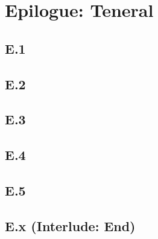 \part{Epilogue: Teneral}
 \chapter{E.1}
 \chapter{E.2}
 \chapter{E.3}
 \chapter{E.4}
 \chapter{E.5}
 \chapter{E.x (Interlude: End)}







